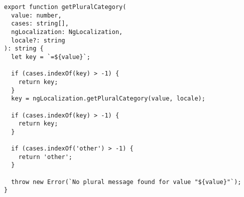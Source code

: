 \begin{verbatim}
export function getPluralCategory(
  value: number,
  cases: string[],
  ngLocalization: NgLocalization,
  locale?: string
): string {
  let key = `=${value}`;

  if (cases.indexOf(key) > -1) {
    return key;
  }
  key = ngLocalization.getPluralCategory(value, locale);

  if (cases.indexOf(key) > -1) {
    return key;
  }

  if (cases.indexOf('other') > -1) {
    return 'other';
  }

  throw new Error(`No plural message found for value "${value}"`);
}
\end{verbatim}

